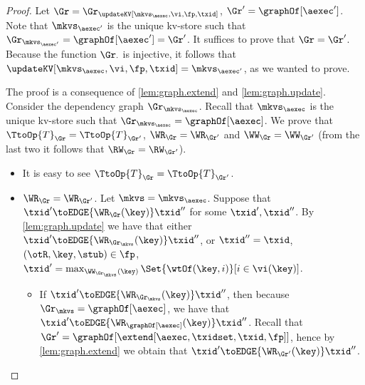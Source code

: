 \begin{proof}
Let $\Gr = \Gr_{\updateKV[\mkvs_{\aexec}, \vi, \fp, \txid]}$, $\Gr' = \graphOf[\aexec']$. 
Note that $\mkvs_{\aexec'}$ is the unique kv-store such that $\Gr_{\mkvs_{\aexec'}} = \graphOf[\aexec'] = \Gr'$. 
It suffices to prove that $\Gr = \Gr'$. Because the function $\Gr_{\cdot}$ is injective, it follows that 
$\updateKV[\mkvs_{\aexec}, \vi, \fp, \txid] = \mkvs_{\aexec'}$, as we wanted to prove.  

The proof is a consequence of \cref{lem:graph.extend} and \cref{lem:graph.update}. 
Consider the dependency graph $\Gr_{\mkvs_{\aexec}}$.
Recall that $\mkvs_{\aexec}$ is the unique kv-store such that $\Gr_{\mkvs_{\aexec}} = \graphOf[\aexec]$. 
We prove that $\TtoOp{T}_{\Gr} = \TtoOp{T}_{\Gr'}$, $\WR_{\Gr} = \WR_{\Gr'}$ and 
$\WW_{\Gr} = \WW_{\Gr'}$ (from the last two it follows that $\RW_{\Gr} = \RW_{\Gr'}$). 
\begin{itemize}
\item It is easy to see $\TtoOp{T}_{\Gr} = \TtoOp{T}_{\Gr'}$.

\item $\WR_{\Gr} = \WR_{\Gr'}$.
Let \( \mkvs  = \mkvs_\aexec \).
Suppose that $\txid' \toEDGE{\WR_{\Gr}(\key)} \txid''$ for some $\txid', \txid''$. 
By \cref{lem:graph.update} we have that either $\txid' \toEDGE{\WR_{\Gr_\mkvs}(\key)} \txid''$, 
or $\txid'' = \txid$, $(\otR, \key, \stub) \in \fp$, $\txid' = \max_{\WW_{\Gr_\mkvs}(\key)}\Set{\wtOf(\key, i) }[i \in \vi(\key)]$. 

\begin{itemize}
\item If $\txid' \toEDGE{\WR_{\Gr_\mkvs}(\key)} \txid''$, then because 
$\Gr_\mkvs = \graphOf[\aexec]$, we have that $\txid' \toEDGE{\WR_{\graphOf[\aexec]}(\key)} \txid''$. 
Recall that $\Gr' = \graphOf[\extend[\aexec, \txidset, \txid, \fp]]$, hence by \cref{lem:graph.extend} 
we obtain that $\txid' \toEDGE{\WR_{\Gr'}(\key)} \txid''$. 


\end{itemize}
\end{itemize}
\end{proof}
